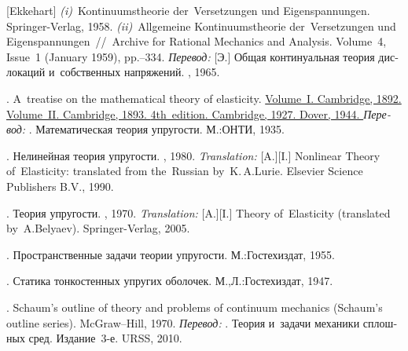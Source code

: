\begin{thebibliography}{123}
\begin{otherlanguage}{russian}
[Ekkehart] \emph{(i)}~Kontinuumstheorie der~Versetzungen und Eigen\-spannung\-en. Springer\hbox{-}Verlag, 1958. 
\emph{(ii)}~Allgemeine Kontinuumstheorie der~Versetzungen und Eigen\-span\-nung\-en~//~Archive for Rational Mechanics and Analysis. Volume~4, Issue~1 (January 1959), pp.\hbox{--}334.
\emph{Перевод:} [Э.] Общая континуальная теория дислокаций и~собственных напряжений. \mirpublisher, 1965. 

.
A~treatise on the mathematical theory of elasticity.
\href{https://hal.archives-ouvertes.fr/hal-01307751/document}{
Volume~I.
Cambridge, 1892.
}
\href{https://archive.org/details/in.ernet.dli.2015.503659}{
Volume~II.
Cambridge, 1893.
}
\href{https://archive.org/details/in.ernet.dli.2015.462644/page/n1}{
4th~edition.
Cambridge, 1927.
Dover, 1944.
}
\emph{Перевод:}
.
Математическая теория упругости.
М.:\;ОНТИ,
1935.

.
Нелинейная теория упругости.
\naukapublisher, 1980.
\emph{Translation:}
[A.][I.]
Nonlinear Theory of~Elasticity:
translated from the~Russian by~K.\,A.\;Lurie.
Elsevier Science Publishers \hbox{B.\hspace{.1ex}V\hspace{-0.2ex}.}, 1990.

.
Теория упругости.
\naukapublisher, 1970.
\emph{Translation:}
[A.][I.]
Theory of~Elasticity (translated by~A.\:Belyaev).
Springer-Verlag, 2005.

.
Пространственные задачи теории упругости.
М.:\;Гос\-тех\-издат, 1955.

.
Статика тонкостенных упругих оболочек.
М.,\:Л.:\;Гос\-тех\-издат, 1947.

.
Schaum’s outline of theory and problems of continuum mechanics
(Schaum’s outline series).
McGraw\hbox{--}Hill,
1970.
\emph{Перевод:}
.
Теория и~задачи механики сплошных сред.
Издание~3\hbox{-}е.
URSS, 2010.


\end{otherlanguage}
\end{thebibliography}
